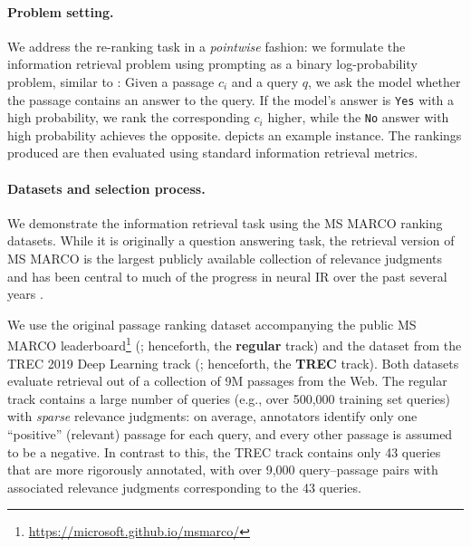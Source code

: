
\paragraph{Problem setting.}
We address the re-ranking task in a \textit{pointwise} fashion: we formulate the information retrieval problem using prompting as a binary log-probability problem, similar to \citet{nogueira2019passage}: Given a passage $c_i$ and a query $q$, we ask the model whether the passage contains an answer to the query. 
If the model's answer is \texttt{Yes} with a high probability, we rank the corresponding $c_i$ higher, while the \texttt{No} answer with high probability achieves the opposite. 
 depicts an example instance.
The rankings produced are then evaluated using standard information retrieval metrics.

\paragraph{Datasets and selection process.} 
We demonstrate the information retrieval task using the MS MARCO ranking datasets. 
While it is originally a question answering task, the retrieval version of MS MARCO is the largest publicly available collection of relevance judgments and has been central to much of the progress in neural IR over the past several years \citep{lin2021pretrained}.

We use the original passage ranking dataset accompanying the public MS MARCO leaderboard\footnote{\url{https://microsoft.github.io/msmarco/}} (\citealt{nguyen2016ms}; henceforth, the \textbf{regular} track) and the dataset from the TREC 2019 Deep Learning track (\citealt{craswell2020overview}; henceforth, the \textbf{TREC} track). Both datasets evaluate retrieval out of a collection of 9M passages from the Web. The regular track contains a large number of queries (e.g., over 500,000 training set queries) with \textit{sparse} relevance judgments: on average, annotators identify only one ``positive'' (relevant) passage for each query, and every other passage is assumed to be a negative. In contrast to this, the TREC track contains only 43 queries that are more rigorously annotated, with over 9,000 query--passage pairs with associated relevance judgments corresponding to the 43 queries.

